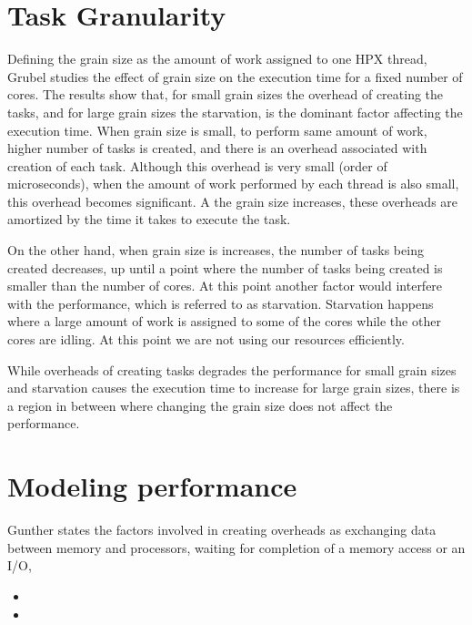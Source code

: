 \vspace{\baselineskip}
\section{Task Granularity}
Defining the grain size as the amount of work assigned to one HPX thread, Grubel\cite{grubel2015performance} studies the effect of grain size on the execution time for a fixed number of cores. The results show that, for small grain sizes the overhead of creating the tasks, and for large grain sizes the starvation, is the dominant factor affecting the execution time\cite{grubel2015performance}. When grain size is small, to perform same amount of work, higher number of tasks is created, and there is an overhead associated with creation of each task. Although this overhead is very small (order of microseconds), when the amount of work performed by each thread is also small, this overhead becomes significant. A the grain size increases, these overheads are amortized by the time it takes to execute the task. 

On the other hand, when grain size is increases, the number of tasks being created decreases, up until a point where the number of tasks being created is smaller than the number of cores. At this point another factor would interfere with the performance, which is referred to as starvation. Starvation happens where a large amount of work is assigned to some of the cores while the other cores are idling. At this point we are not using our resources efficiently. 

While overheads of creating tasks degrades the performance for small grain sizes and starvation causes the execution time to increase for large grain sizes, there is a region in between where changing the grain size does not affect the performance. 

\vspace{\baselineskip}
\section{Modeling performance}
Gunther states the factors involved in creating overheads as exchanging data between memory and processors, waiting for completion of a memory access or an I/O, 
\begin{itemize}
	\item 
	\item
\end{itemize}

\vspace{\baselineskip}

